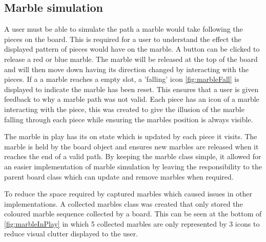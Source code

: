 \documentclass{l4proj}
\begin{document}
\subsection{Marble simulation}
A user must be able to simulate the path a marble would take following the pieces on the board. This is required for a user to understand the effect the displayed pattern of pieces would have on the marble. A button can be clicked to release a red or blue marble. The marble will be released at the top of the board and will then move down having its direction changed by interacting with the pieces. If a a marble reaches a empty slot, a 'falling' icon \ref{fig:marbleFall} is displayed to indicate the marble has been reset. This ensures that a user is given feedback to why a marble path was not valid. Each piece has an icon of a marble interacting with the piece, this was created to give the illusion of the marble falling through each piece while ensuring the marbles position is always visible.

The marble in play has its on state which is updated by each piece it visits. The marble is held by the board object and ensures new marbles are released when it reaches the end of a valid path. By keeping the marble class simple, it allowed for an easier implementation of marble simulation by leaving the responsibility to the parent board class which can update and remove marbles when required. 


To reduce the space required by captured marbles which caused issues in other implementations. A collected marbles class was created that only stored the coloured marble sequence collected by a board. This can be seen at the bottom of \ref{fig:marbleInPlay} in which 5 collected marbles are only represented by 3 icons to reduce visual clutter displayed to the user.
\end{document}
